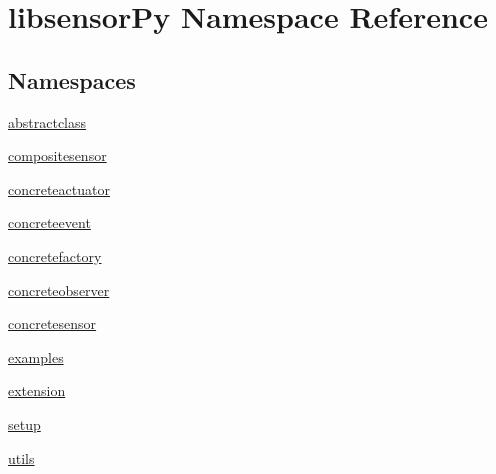 \hypertarget{namespacelibsensorPy}{}\section{libsensor\+Py Namespace Reference}
\label{namespacelibsensorPy}
\subsection*{Namespaces}
\begin{DoxyCompactItemize}
\item 
 \hyperlink{namespacelibsensorPy_1_1abstractclass}{abstractclass}
\item 
 \hyperlink{namespacelibsensorPy_1_1compositesensor}{compositesensor}
\item 
 \hyperlink{namespacelibsensorPy_1_1concreteactuator}{concreteactuator}
\item 
 \hyperlink{namespacelibsensorPy_1_1concreteevent}{concreteevent}
\item 
 \hyperlink{namespacelibsensorPy_1_1concretefactory}{concretefactory}
\item 
 \hyperlink{namespacelibsensorPy_1_1concreteobserver}{concreteobserver}
\item 
 \hyperlink{namespacelibsensorPy_1_1concretesensor}{concretesensor}
\item 
 \hyperlink{namespacelibsensorPy_1_1examples}{examples}
\item 
 \hyperlink{namespacelibsensorPy_1_1extension}{extension}
\item 
 \hyperlink{namespacelibsensorPy_1_1setup}{setup}
\item 
 \hyperlink{namespacelibsensorPy_1_1utils}{utils}
\end{DoxyCompactItemize}
